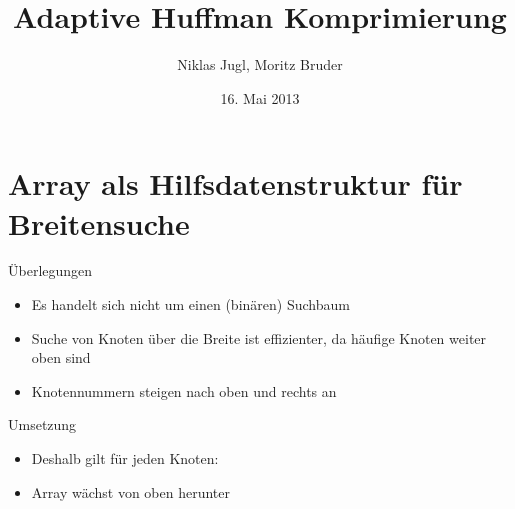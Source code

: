 \documentclass[utf8x]{beamer}
\title{Adaptive Huffman Komprimierung}
\date{16. Mai 2013}
\author{Niklas Jugl, Moritz Bruder}
\begin{document}

    \frame{

        \titlepage
    }



    
    \section{Array als Hilfsdatenstruktur für Breitensuche}
    \frame{\tableofcontents[currentsection]}
    \begin{frame}[<+->]
    
        \begin{block}{Überlegungen}
            \begin{itemize}
                \item
                    Es handelt sich nicht um einen (binären) Suchbaum
            
                \item
                    Suche von Knoten über die Breite ist effizienter, da häufige Knoten weiter oben sind
                
                \item
                    Knotennummern steigen nach oben und rechts an
                    
            \end{itemize}
        \end{block}
    \end{frame}
    \begin{frame}[<+->]

        \begin{block}{Umsetzung}
            \begin{itemize}
                \item
                    Deshalb gilt für jeden Knoten:
                    \begin{quote}
                        \equalityCode
                    \end{quote}
                \item
                    Array wächst von oben herunter
            \end{itemize}
        \end{block}
    \end{frame}
\end{document}
